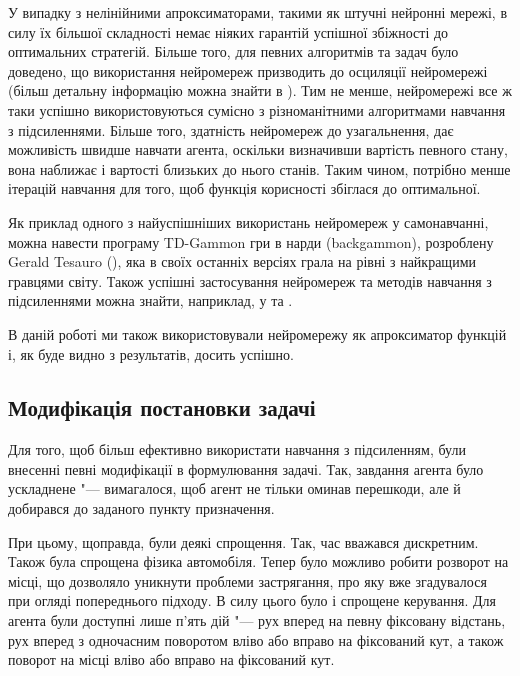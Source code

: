 \documentclass[a4paper,10pt,fleqn]{article}
\begin{document}
У випадку з нелінійними апроксиматорами, такими як штучні нейронні мережі, в силу їх більшої складності немає ніяких гарантій успішної збіжності до оптимальних стратегій. Більше того, для певних алгоритмів та задач було доведено, що використання нейромереж призводить до осциляції нейромережі (більш детальну інформацію можна знайти в \cite{SuttonBarto2002}). Тим не менше, нейромережі все ж таки успішно використовуються сумісно з різноманітними алгоритмами навчання з підсиленнями. Більше того, здатність нейромереж до узагальнення, дає можливість швидше навчати агента, оскільки визначивши вартість певного стану, вона наближає і вартості близьких до нього станів. Таким чином, потрібно менше ітерацій навчання для того, щоб функція корисності збіглася до оптимальної.

Як приклад одного з найуспішніших використань нейромереж у самонавчанні, можна навести програму TD-Gammon гри в нарди (backgammon), розроблену Gerald Tesauro (\cite{Tesauro1995}), яка в своїх останніх версіях грала на рівні з найкращими гравцями світу. Також успішні застосування нейромереж та методів навчання з підсиленнями можна знайти, наприклад, у \cite{Rummery1995} та \cite{Coulom2002}.

В даній роботі ми також використовували нейромережу як апроксиматор функцій і, як буде видно з результатів, досить успішно.

\subsection{Модифікація постановки задачі}

Для того, щоб більш ефективно використати навчання з підсиленням, були внесенні певні модифікації в формулювання задачі. Так, завдання агента було ускладнене "--- вимагалося, щоб агент не тільки оминав перешкоди, але й добирався до заданого пункту призначення.

При цьому, щоправда, були деякі спрощення. Так, час вважався дискретним. Також була спрощена фізика автомобіля. Тепер було можливо робити розворот на місці, що дозволяло уникнути проблеми застрягання, про яку вже згадувалося при огляді попереднього підходу. В силу цього було і спрощене керування. Для агента були доступні лише п'ять дій "--- рух вперед на певну фіксовану відстань, рух вперед з одночасним поворотом вліво або вправо на фіксований кут, а також поворот на місці вліво або вправо на фіксований кут. 
\end{document}
